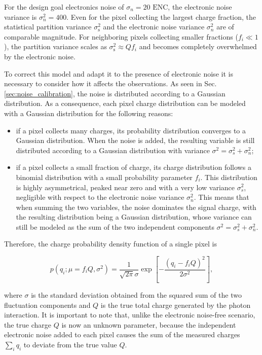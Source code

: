 For the design goal electronics noise of $\sigma_n = 20\text{ ENC}$, the electronic noise variance is $\sigma_n^2 = 400$. Even for the pixel collecting the largest charge fraction, the statistical partition variance $\sigma_{\text{s}}^2$ and the electronic noise variance $\sigma_n^2$ are of comparable magnitude. For neighboring pixels collecting smaller fractions ($f_i \ll 1$), the partition variance scales as $\sigma_{\text{s}}^2 \approx Q f_i$ and becomes completely overwhelmed by the electronic noise.

To correct this model and adapt it to the presence of electronic noise it is necessary to consider how it affects the observations. As seen in Sec. \ref{sec:noise_calibration}, the noise is distributed according to a Gaussian distribution. As a consequence, each pixel charge distribution can be modeled with a Gaussian distribution for the following reasons:

\begin{itemize}[label=-]
\item if a pixel collects many charges, its probability distribution converges to a Gaussian distribution. When the noise is added, the resulting variable is still distributed according to a Gaussian distribution with variance $\sigma^2 = \sigma^2_s + \sigma^2_n$;

\item if a pixel collects a small fraction of charge, its charge distribution follows a binomial distribution with a small probability parameter $f_i$. This distribution is highly asymmetrical, peaked near zero and with a very low variance $\sigma^2_s$, negligible with respect to the electronic noise variance $\sigma^2_n$. This means that when summing the two variables, the noise dominates the signal charge, with the resulting distribution being a Gaussian distribution, whose variance can still be modeled as the sum of the two independent components $\sigma^2 = \sigma^2_s + \sigma^2_n$.
\end{itemize}

Therefore, the charge probability density function of a single pixel is

\begin{equation}
p(q_i; \mu = f_i Q , \sigma^2) = \frac{1}{\sqrt{2\pi}\sigma} \exp \left[- \frac{(q_i - f_i Q)^2}{2\sigma^2} \right],
\label{eq:pdf_mle}
\end{equation}

where $\sigma$ is the standard deviation obtained from the squared sum of the two fluctuation components and $Q$ is the true total charge generated by the photon interaction. It is important to note that, unlike the electronic noise-free scenario, the true charge $Q$ is now an unknown parameter, because the independent electronic noise added to each pixel causes the sum of the measured charges $\sum_i q_i$ to deviate from the true value $Q$.

